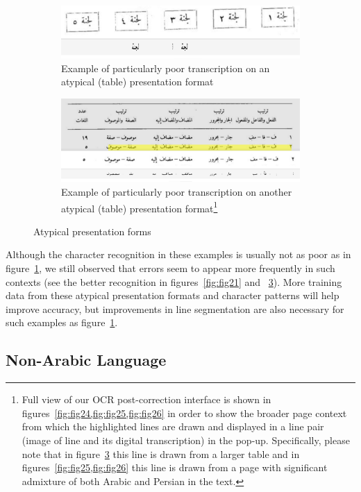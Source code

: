 \begin{figure}[h]
\begin{subfigure}[b]{0.45\linewidth}
	\centering
	\includegraphics[width=\textwidth]{images/image10.png}
	\caption{Example of particularly poor transcription on an atypical (table) presentation format}
	\label{fig:fig23}
	\end{subfigure}
	\begin{subfigure}[b]{0.45\linewidth}
	\centering
	\includegraphics[width=\textwidth]{images/image11.png}
	\caption{Example of particularly poor transcription on another atypical
(table) presentation format\footnote{Full view of our OCR post-correction
interface is shown in figures~\ref{fig:fig24,fig:fig25,fig:fig26} in order to
show the broader page context from which the highlighted lines are drawn and
displayed in a line pair (image of line and its digital transcription) in the
pop-up. Specifically, please note that in figure~\ref{fig:fig24} this line is
drawn from a larger table and in figures~\ref{fig:fig25,fig:fig26} this line is
drawn from a page with significant admixture of both Arabic and Persian in the
text.}}
	\label{fig:fig24}
	\end{subfigure}
	\caption{Atypical presentation forms}
\end{figure}

Although the character recognition in these examples is usually not as poor as
in figure~\ref{fig:fig23}, we still observed that errors seem to appear more
frequently in such contexts (see the better recognition in
figures~\ref{fig:fig21} and ~\ref{fig:fig24}). More training data from these
atypical presentation formats and character patterns will help improve
accuracy, but improvements in line segmentation are also necessary for such
examples as figure~\ref{fig:fig23}.

\subsection{Non-Arabic Language}

